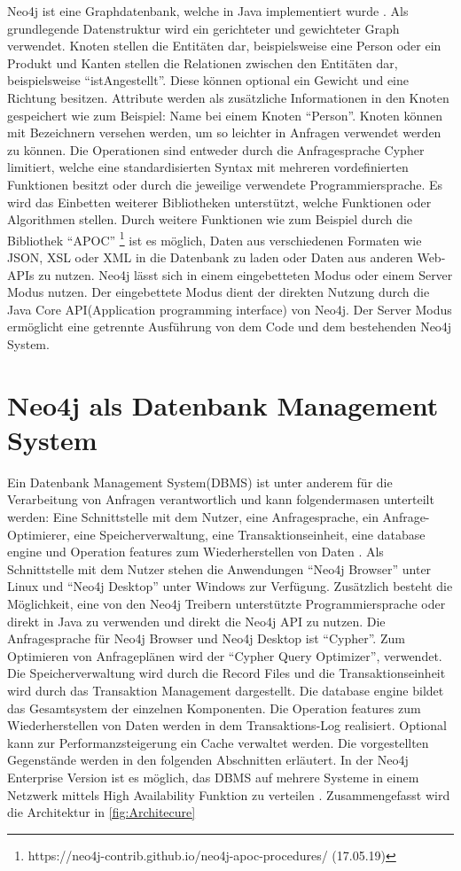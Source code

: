 Neo4j ist eine Graphdatenbank, welche in Java implementiert wurde \parencite{vukotic2015neo4j}. Als grundlegende Datenstruktur wird ein gerichteter und gewichteter Graph verwendet. Knoten stellen die Entitäten dar, beispielsweise eine Person oder ein Produkt und  Kanten stellen die Relationen zwischen den Entitäten dar, beispielsweise “istAngestellt”. Diese können optional ein Gewicht und eine Richtung besitzen. Attribute werden als zusätzliche Informationen in den Knoten gespeichert wie zum Beispiel: Name bei einem Knoten “Person”. Knoten können mit Bezeichnern versehen werden, um so leichter in Anfragen  verwendet werden zu können. Die Operationen sind entweder durch die  Anfragesprache  Cypher limitiert, welche eine standardisierten Syntax mit  mehreren vordefinierten Funktionen besitzt oder durch die jeweilige verwendete Programmiersprache. Es wird das Einbetten weiterer Bibliotheken unterstützt, welche  Funktionen oder Algorithmen stellen. Durch weitere Funktionen wie zum Beispiel durch die Bibliothek “APOC” \footnote{https://neo4j-contrib.github.io/neo4j-apoc-procedures/ (17.05.19) } ist es möglich, Daten aus verschiedenen Formaten wie JSON, XSL oder XML in die Datenbank zu laden oder Daten aus anderen Web-APIs zu nutzen. Neo4j lässt sich in einem  eingebetteten Modus oder einem  Server Modus nutzen. Der eingebettete Modus dient der direkten  Nutzung durch die Java Core API(Application programming interface) von Neo4j. Der Server Modus ermöglicht eine getrennte Ausführung von dem Code und dem bestehenden Neo4j System. 

\section{Neo4j als Datenbank Management System}
Ein Datenbank Management System(DBMS) ist unter anderem für die Verarbeitung von Anfragen verantwortlich und kann folgendermasen unterteilt werden: Eine Schnittstelle mit dem Nutzer, eine Anfragesprache, ein Anfrage-Optimierer,  eine Speicherverwaltung, eine Transaktionseinheit, eine database engine und Operation features zum Wiederherstellen von Daten \parencite{angles2012comparison}. Als Schnittstelle mit dem Nutzer stehen die Anwendungen “Neo4j Browser” unter Linux und “Neo4j Desktop” unter Windows zur Verfügung.     Zusätzlich besteht die Möglichkeit, eine von den Neo4j Treibern unterstützte Programmiersprache  oder direkt in Java zu verwenden und direkt die Neo4j API zu nutzen. Die Anfragesprache für Neo4j Browser und Neo4j Desktop ist “Cypher”. Zum Optimieren von Anfrageplänen wird der “Cypher Query Optimizer”, verwendet. Die Speicherverwaltung wird durch die Record Files und die Transaktionseinheit  wird durch das Transaktion Management dargestellt. Die database engine bildet das Gesamtsystem der einzelnen Komponenten. Die Operation features zum Wiederherstellen von Daten werden in dem Transaktions-Log realisiert. Optional kann zur  Performanzsteigerung ein Cache verwaltet werden. Die vorgestellten Gegenstände werden in den folgenden Abschnitten erläutert. In der Neo4j Enterprise Version ist es möglich, das DBMS auf mehrere Systeme in einem Netzwerk mittels High Availability Funktion zu verteilen \parencite{vukotic2015neo4j}. Zusammengefasst wird die Architektur in \ref{fig:Architecure}

